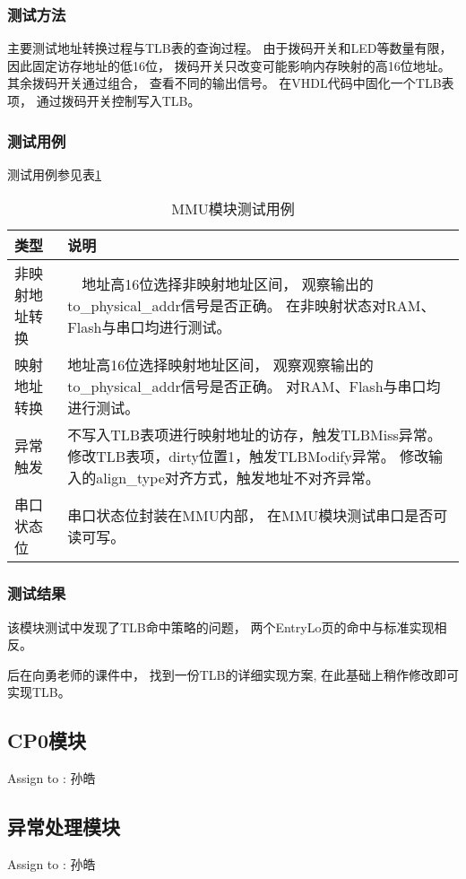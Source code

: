         \subsubsection{测试方法}
            主要测试地址转换过程与TLB表的查询过程。%
            由于拨码开关和LED等数量有限，%
            因此固定访存地址的低16位，%
            拨码开关只改变可能影响内存映射的高16位地址。%
            其余拨码开关通过组合，%
            查看不同的输出信号。%
            在VHDL代码中固化一个TLB表项，%
            通过拨码开关控制写入TLB。

        \subsubsection{测试用例}
            测试用例参见表\ref{mmu_module}
            \begin{table}[!hbp]
            \centering
            \caption{MMU模块测试用例}
            \label{mmu_module}
            \begin{tabularx}{\textwidth}{|l|X|}
            \hline
            类型 & 说明 \\
            \hline
            非映射地址转换 &　地址高16位选择非映射地址区间，%
                            观察输出的to\_physical\_addr信号是否正确。%
                            在非映射状态对RAM、Flash与串口均进行测试。   \\
            \hline
            映射地址转换 & 地址高16位选择映射地址区间，%
                            观察观察输出的to\_physical\_addr信号是否正确。%
                            对RAM、Flash与串口均进行测试。    \\
            \hline
            异常触发 & 不写入TLB表项进行映射地址的访存，触发TLBMiss异常。%
                        修改TLB表项，dirty位置1，触发TLBModify异常。%
                        修改输入的align\_type对齐方式，触发地址不对齐异常。    \\
            \hline
            串口状态位 & 串口状态位封装在MMU内部，%
                        在MMU模块测试串口是否可读可写。 \\
            \hline
            \end{tabularx}
            \end{table}

        \subsubsection{测试结果}
            该模块测试中发现了TLB命中策略的问题，%
            两个EntryLo页的命中与标准实现相反。%

            后在向勇老师的课件中，%
            找到一份TLB的详细实现方案,%
            在此基础上稍作修改即可实现TLB。

    \subsection{CP0模块}
        Assign to  : 孙皓

    \subsection{异常处理模块}
        Assign to  : 孙皓
